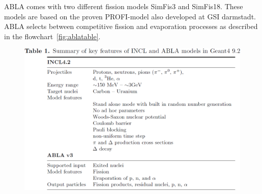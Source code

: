 ABLA comes with two different fission models SimFis3 and SimFis18. These models are based on the proven PROFI-model also developed at GSI darmstadt. ABLA selects between competitive fission and evaporation processes as described in the flowchart~\ref{fig:ablatable}.

\begin{figure}[h] 
\begin{center}
\includegraphics[width=1\textwidth]{images/inclSummary.png}  
\caption{\label{fig:inclpotential}}
 
 \end{center}
 \end{figure}


